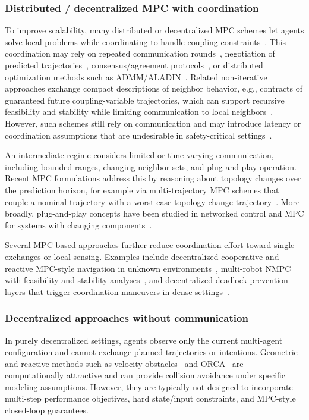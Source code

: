 \documentclass[twocolumn]{autart}
\begin{document}
\subsubsection*{Distributed / decentralized MPC with coordination}
To improve scalability, many distributed or decentralized MPC schemes let agents solve local problems while coordinating to handle coupling constraints~\cite{Scattolini2009,Negenborn2009}. This coordination may rely on repeated communication rounds~\cite{CommunicationRounds}, negotiation of predicted trajectories~\cite{Negotiation}, consensus/agreement protocols~\cite{Lunze2022}, or distributed optimization methods such as ADMM/ALADIN~\cite{Aladin}. Related non-iterative approaches exchange compact descriptions of neighbor behavior, e.g., contracts of guaranteed future coupling-variable trajectories, which can support recursive feasibility and stability while limiting communication to local neighbors~\cite{LUCIA2015205}. However, such schemes still rely on communication and may introduce latency or coordination assumptions that are undesirable in safety-critical settings~\cite{Stewart2010,KOHLER20191,Venkat2007}.

An intermediate regime considers limited or time-varying communication, including bounded ranges, changing neighbor sets, and plug-and-play operation. Recent MPC formulations address this by reasoning about topology changes over the prediction horizon, for example via multi-trajectory MPC schemes that couple a nominal trajectory with a worst-case topology-change trajectory~\cite{Saccani2023}. More broadly, plug-and-play concepts have been studied in networked control and MPC for systems with changing components~\cite{Stoustrup2009,Riverso2013,LUCIA2015205}.

Several MPC-based approaches further reduce coordination effort toward single exchanges or local sensing. Examples include decentralized cooperative and reactive MPC-style navigation in unknown environments~\cite{HoyMatveevSavkin2012}, multi-robot NMPC with feasibility and stability analyses~\cite{LafmejaniBerman2021}, and decentralized deadlock-prevention layers that trigger coordination maneuvers in dense settings~\cite{MerryGoRound}. 

\subsubsection*{Decentralized approaches without communication}
In purely decentralized settings, agents observe only the current multi-agent configuration and cannot exchange planned trajectories or intentions. Geometric and reactive methods such as velocity obstacles~\cite{FioriniShiller1998} and ORCA~\cite{vanDenBergORCA2011} are computationally attractive and can provide collision avoidance under specific modeling assumptions. However, they are typically not designed to incorporate multi-step performance objectives, hard state/input constraints, and MPC-style closed-loop guarantees.
\end{document}
